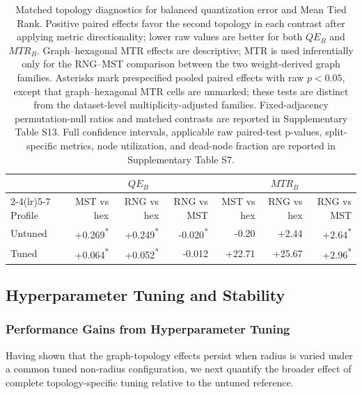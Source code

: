 \documentclass[10pt]{article} %
\begin{document}
\begin{table}[tb]
\caption{Matched topology diagnostics for balanced quantization error and Mean Tied Rank. Positive paired effects favor the second topology in each contrast after applying metric directionality; lower raw values are better for both $QE_B$ and $MTR_B$. Graph--hexagonal MTR effects are descriptive; MTR is used inferentially only for the RNG--MST comparison between the two weight-derived graph families. Asterisks mark prespecified pooled paired effects with raw $p<0.05$, except that graph--hexagonal MTR cells are unmarked; these tests are distinct from the dataset-level multiplicity-adjusted families. Fixed-adjacency permutation-null ratios and matched contrasts are reported in Supplementary Table S13. Full confidence intervals, applicable raw paired-test p-values, split-specific metrics, node utilization, and dead-node fraction are reported in Supplementary Table S7.}
\label{tab:matched_topology_diagnostics_summary}
\begin{center}
\begin{tabular}{lrrrrrr}
\toprule
& \multicolumn{3}{c}{$QE_B$} & \multicolumn{3}{c}{$MTR_B$} \\
\cmidrule(lr){2-4}\cmidrule(lr){5-7}
Profile & MST vs hex & RNG vs hex & RNG vs MST & MST vs hex & RNG vs hex & RNG vs MST \\
\midrule
Untuned & +0.269\textsuperscript{*} & +0.249\textsuperscript{*} & -0.020\textsuperscript{*} & -0.20 & +2.44 & +2.64\textsuperscript{*} \\
Tuned & +0.064\textsuperscript{*} & +0.052\textsuperscript{*} & -0.012 & +22.71 & +25.67 & +2.96\textsuperscript{*} \\
\bottomrule
\end{tabular}
\end{center}
\end{table}

\subsection{Hyperparameter Tuning and Stability}

\subsubsection{Performance Gains from Hyperparameter Tuning}

Having shown that the graph-topology effects persist when radius is varied under a common tuned non-radius configuration, we next quantify the broader effect of complete topology-specific tuning relative to the untuned reference.
\end{document}
